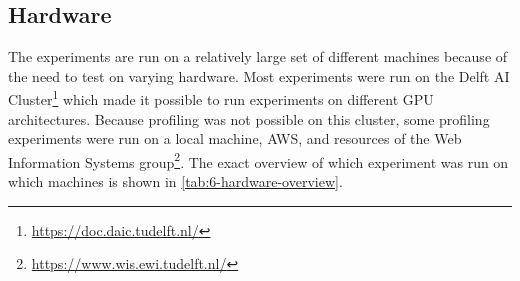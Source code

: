 


\subsection{Hardware}
\label{subsec:6-hardware}

The experiments are run on a relatively large set of different machines because of the need to test on varying hardware. Most experiments were run on the Delft AI Cluster\footnote{\url{https://doc.daic.tudelft.nl/}} which made it possible to run experiments on different GPU architectures. Because profiling was not possible on this cluster, some profiling experiments were run on a local machine, AWS, and resources of the Web Information Systems group\footnote{\url{https://www.wis.ewi.tudelft.nl/}}. The exact overview of which experiment was run on which machines is shown in \autoref{tab:6-hardware-overview}.

